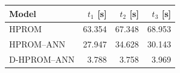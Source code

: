 \begin{tabular}{lrrr}
\toprule
Model & $t_1$ [s] & $t_2$ [s] & $t_3$ [s] \\
\midrule
HPROM & 63.354 & 67.348 & 68.953 \\
HPROM--ANN & 27.947 & 34.628 & 30.143 \\
D-HPROM--ANN & 3.788 & 3.758 & 3.969 \\
\bottomrule
\end{tabular}

